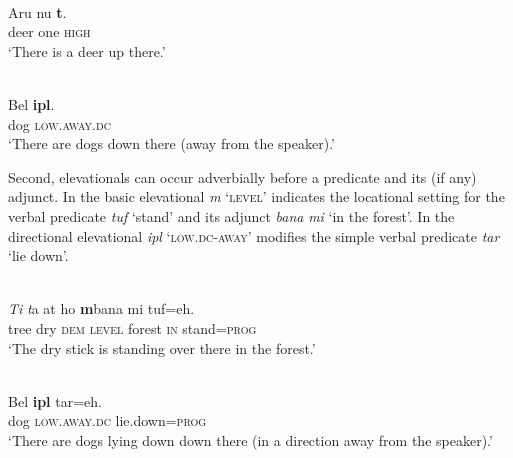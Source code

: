 \ea%
\label{ex:7:22}
 \\
\gll  Aru   nu  \textbf{{t}}\textbf{{{\textopeno}}}\textbf{{{\ng}}}{.}  \\
   deer  one  \textsc{high}   \\
\glt   `There is a deer up there.'
\z









\ea%
\label{ex:7:23}
 \\
\gll  Bel  \textbf{{ipl}}\textbf{{{\textepsilon}}}{.}  \\
  dog  \textsc{low.away.dc}    \\
\glt   `There are dogs down there (away from the speaker).'
\z







Second, elevationals can occur adverbially before a predicate and its (if any) adjunct. In  the basic elevational \textit{m}\textit{{\textopeno}}\textit{{\ng}} `\textsc{level}' indicates the locational setting for the verbal predicate \textit{tuf} `stand' and its adjunct \textit{bana} \textit{mi} `in the forest'. In  the directional elevational \textit{ipl}\textit{{\textepsilon}} \textsc{`low.dc-away'} modifies the simple verbal predicate \textit{tar} `lie down'. 



\ea%
\label{ex:7:24}
 \\
\gll  \textit{Ti} \textit ta {{\textglotstop}}{at}  ho  \textbf{{m}}\textbf{{{\textopeno}}}\textbf{{{\ng}}}{bana}  mi  {tuf=eh.} \\
    tree  dry  \textsc{dem} \textsc {level} forest  \textsc{in} stand=\textsc{prog} \\
\glt   `The dry stick is standing over there in the forest.'
\z









\ea%
\label{ex:7:25}
 \\
\gll   Bel  \textbf{ipl}\textbf{\textepsilon} tar=eh. \\
   dog  \textsc{low.away.dc} lie.down=\textsc{prog}   \\
\glt   `There are dogs lying down down there (in a direction away from the speaker).' 
\z







